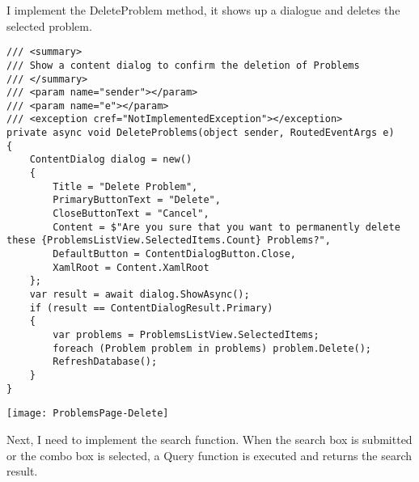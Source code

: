 \documentclass[report.tex]{subfiles}
\begin{document}
I implement the DeleteProblem method, it shows up a dialogue and deletes the selected problem.

\begin{verbatim}
/// <summary>
/// Show a content dialog to confirm the deletion of Problems
/// </summary>
/// <param name="sender"></param>
/// <param name="e"></param>
/// <exception cref="NotImplementedException"></exception>
private async void DeleteProblems(object sender, RoutedEventArgs e)
{
    ContentDialog dialog = new()
    {
        Title = "Delete Problem",
        PrimaryButtonText = "Delete",
        CloseButtonText = "Cancel",
        Content = $"Are you sure that you want to permanently delete these {ProblemsListView.SelectedItems.Count} Problems?",
        DefaultButton = ContentDialogButton.Close,
        XamlRoot = Content.XamlRoot
    };
    var result = await dialog.ShowAsync();
    if (result == ContentDialogResult.Primary)
    {
        var problems = ProblemsListView.SelectedItems;
        foreach (Problem problem in problems) problem.Delete();
        RefreshDatabase();
    }
}
\end{verbatim}

\texttt{[image: ProblemsPage-Delete]}

Next, I need to implement the search function. When the search box is submitted or the combo box is selected, a Query function is executed and returns the search result.
\end{document}
